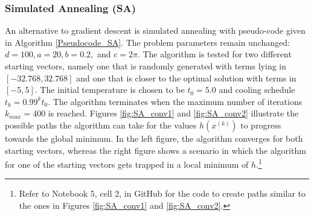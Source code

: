 \subsubsection{Simulated Annealing (SA)}
An alternative to gradient descent is simulated annealing with pseudo-code given in Algorithm \ref{Pseudocode_SA}. The problem parameters remain unchanged: $d=100, a=20, b=0.2,$ and $c=2\pi.$ The algorithm is tested for two different starting vectors, namely one that is randomly generated with terms lying in $\left[-32.768,32.768\right]$ and one that is closer to the optimal solution with terms in $\left[-5,5\right].$ The initial temperature is chosen to be $t_0=5.0$ and cooling schedule $t_{k} = 0.99^{k}t_0.$ The algorithm terminates when the maximum number of iterations $k_{max}=400$ is reached. Figures \ref{fig:SA_conv1} and \ref{fig:SA_conv2} illustrate the possible paths the algorithm can take for the values $h(x^{(k)})$ to progress towards the global minimum. In the left figure, the algorithm converges for both starting vectors, whereas the right figure shows a scenario in which the algorithm for one of the starting vectors gets trapped in a local minimum of $h$.\footnote{Refer to Notebook 5, cell 2, in GitHub \cite{ThesisCode2023} for the code to create paths similar to the ones in Figures \ref{fig:SA_conv1} and \ref{fig:SA_conv2}.}
